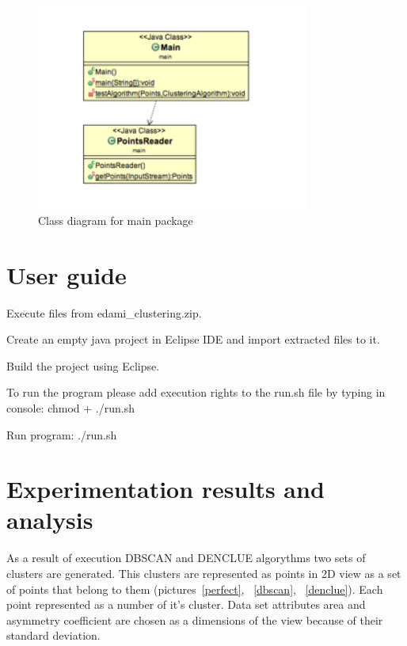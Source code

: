 \documentclass[12pt, a4paper, notitlepage, oneside]{article}
\begin{document}
\begin{itemize}
	\begin{figure}[!ht]
 	\centering
	\includegraphics[width=0.8\textwidth]{images/main_package.png}
 	\caption[]
	{Class diagram for main package}
\label{main}
	\end{figure}

\end{itemize}



\section*{User guide}


Execute files from edami\_clustering.zip.


Create an empty java project in Eclipse IDE and import extracted files to it. 


Build the project using Eclipse.


To run the program please add execution rights to the run.sh file by typing in console: 
	chmod + ./run.sh 


Run program:
 ./run.sh

\newpage


\section*{Experimentation results and analysis}

As a result of execution DBSCAN and DENCLUE algorythms two sets of clusters are generated. This clusters are represented as points in 2D view as a set of points that belong to them (pictures~\ref{perfect}, ~\ref{dbscan}, ~\ref{denclue}). Each point represented as a number of it’s cluster. Data set attributes area and asymmetry coefficient are chosen as a dimensions of the view because of their standard deviation. 
\end{document}
